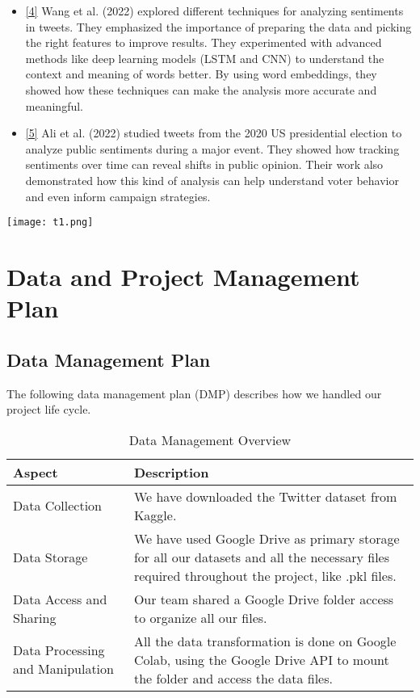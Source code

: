 \documentclass[journal]{IEEEtran}
\begin{document}
\begin{itemize}
\item\href{https://www.researchgate.net/publication/365618365_Sentiment_Analysis_of_Twitter_Data/fulltext/637b777754eb5f547cf040b8/Sentiment-Analysis-of-Twitter-Data.pdf}{[4]} Wang et al. (2022) explored different techniques for analyzing sentiments in tweets. They emphasized the importance of preparing the data and picking the right features to improve results. They experimented with advanced methods like deep learning models (LSTM and CNN) to understand the context and meaning of words better. By using word embeddings, they showed how these techniques can make the analysis more accurate and meaningful.
\item\href{https://journalofbigdata.springeropen.com/articles/10.1186/s40537-022-00633-z}{[5]} Ali et al. (2022) studied tweets from the 2020 US presidential election to analyze public sentiments during a major event. They showed how tracking sentiments over time can reveal shifts in public opinion. Their work also demonstrated how this kind of analysis can help understand voter behavior and even inform campaign strategies.

\end{itemize}

\texttt{[image: t1.png]}
\section{Data and Project Management Plan}



\subsection{\textbf{Data Management Plan}}
The following data management plan (DMP) describes how we handled our project life cycle. 
\begin{table}[H]
\centering
\begin{tabular}{|p{2cm}|p{4cm}|}
\hline
\textbf{Aspect} & \textbf{Description} \\ 
\hline
Data Collection & We have downloaded the Twitter dataset from Kaggle. \\ 
\hline
Data Storage & We have used Google Drive as primary storage for all our datasets and all the necessary files required throughout the project, like .pkl files. \\ 
\hline
Data Access and Sharing & Our team shared a Google Drive folder access to organize all our files. \\ 
\hline
Data Processing and Manipulation & All the data transformation is done on Google Colab, using the Google Drive API to mount the folder and access the data files. \\ 
\hline
\end{tabular}
\caption{Data Management Overview}
\label{table:data_management}
\end{table}
\end{document}
